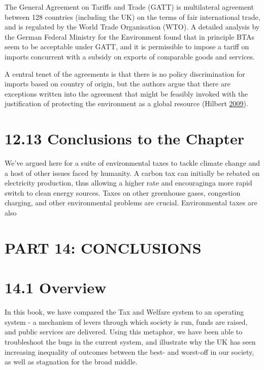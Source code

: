 \documentclass[]{tufte-handout}
\begin{document}
The General Agreement on Tariffs and Trade (GATT) is multilateral
agreement between 128 countries (including the UK) on the terms of fair
international trade, and is regulated by the World Trade Organisation
(WTO). A detailed analysis by the German Federal Ministry for the
Environment found that in principle BTAs seem to be acceptable under
GATT, and it is permissible to impose a tariff on imports concurrent
with a subsidy on exports of comparable goods and services.

A central tenet of the agreements is that there is no policy
discrimination for imports based on country of origin, but the authors
argue that there are exceptions written into the agreement that might be
feasibly invoked with the justification of protecting the environment as
a global resource (Hilbert \protect\hyperlink{ref-Hilbert2009}{2009}).

\hypertarget{conclusions-to-the-chapter}{%
\section{12.13 Conclusions to the
Chapter}\label{conclusions-to-the-chapter}}

We've argued here for a suite of environmental taxes to tackle climate
change and a host of other issues faced by humanity. A carbon tax can
initially be rebated on electricity production, thus allowing a higher
rate and encouraginga more rapid switch to clean energy sources. Taxes
on other greenhouse gases, congestion charging, and other environmental
problems are crucial. Environmental taxes are also

\newpage

\hypertarget{part-14-conclusions}{%
\section{PART 14: CONCLUSIONS}\label{part-14-conclusions}}

\hypertarget{overview}{%
\section{14.1 Overview}\label{overview}}

In this book, we have compared the Tax and Welfare system to an
operating system - a mechanism of levers through which society is run,
funds are raised, and public services are delivered. Using this
metaphor, we have been able to troubleshoot the bugs in the current
system, and illustrate why the UK has seen increasing inequality of
outcomes between the best- and worst-off in our society, as well as
stagnation for the broad middle.
\end{document}
